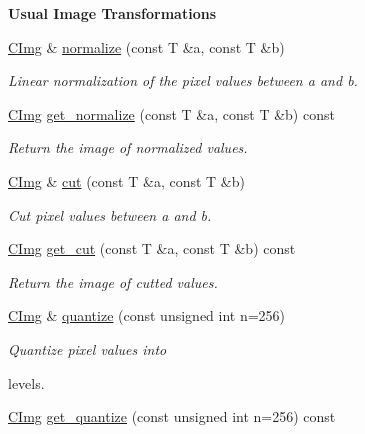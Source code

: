 \begin{Indent}{\bf Usual Image Transformations}
\begin{DoxyCompactItemize}
\item 
\hyperlink{structcimg__library_1_1_c_img}{CImg} \& \hyperlink{structcimg__library_1_1_c_img_aebe5488b504aa1e9f331d63efa6d578b}{normalize} (const T \&a, const T \&b)
\begin{DoxyCompactList}\small\item\em Linear normalization of the pixel values between {\itshape a\/} and {\itshape b\/}. \item\end{DoxyCompactList}\item 
\hyperlink{structcimg__library_1_1_c_img}{CImg} \hyperlink{structcimg__library_1_1_c_img_aaef1a4b9d0b090abb638f1c5ed128b06}{get\_\-normalize} (const T \&a, const T \&b) const 
\begin{DoxyCompactList}\small\item\em Return the image of normalized values. \item\end{DoxyCompactList}\item 
\hyperlink{structcimg__library_1_1_c_img}{CImg} \& \hyperlink{structcimg__library_1_1_c_img_ad74dbbcaf96762284bbf67e2e2ad1a64}{cut} (const T \&a, const T \&b)
\begin{DoxyCompactList}\small\item\em Cut pixel values between {\itshape a\/} and {\itshape b\/}. \item\end{DoxyCompactList}\item 
\hyperlink{structcimg__library_1_1_c_img}{CImg} \hyperlink{structcimg__library_1_1_c_img_ae92404d5e23f0ace476fb541f913dd19}{get\_\-cut} (const T \&a, const T \&b) const 
\begin{DoxyCompactList}\small\item\em Return the image of cutted values. \item\end{DoxyCompactList}\item 
\hyperlink{structcimg__library_1_1_c_img}{CImg} \& \hyperlink{structcimg__library_1_1_c_img_a538daee392c78460c44d35919f1b3826}{quantize} (const unsigned int n=256)
\begin{DoxyCompactList}\small\item\em Quantize pixel values into \par
 levels. \item\end{DoxyCompactList}\item 
\hyperlink{structcimg__library_1_1_c_img}{CImg} \hyperlink{structcimg__library_1_1_c_img_a6d9a0168621176f034f0a52e731b3de2}{get\_\-quantize} (const unsigned int n=256) const 

\end{DoxyCompactItemize}
\end{Indent}

